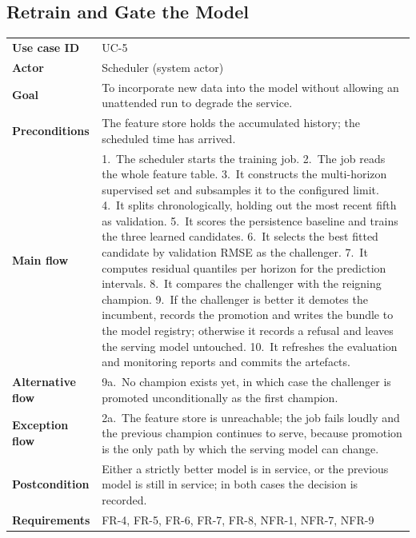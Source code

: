 \subsection{Retrain and Gate the Model}
\begin{xltabular}{\textwidth}{Q{2.9cm} Y}
\toprule
\bfseries Use case ID & UC-5 \\
\bfseries Actor & Scheduler (system actor) \\
\bfseries Goal & To incorporate new data into the model without allowing an
unattended run to degrade the service. \\
\bfseries Preconditions & The feature store holds the accumulated history; the
scheduled time has arrived. \\
\bfseries Main flow & 1.~The scheduler starts the training job. 2.~The job reads
the whole feature table. 3.~It constructs the multi-horizon supervised set and
subsamples it to the configured limit. 4.~It splits chronologically, holding out
the most recent fifth as validation. 5.~It scores the persistence baseline and
trains the three learned candidates. 6.~It selects the best fitted candidate by
validation RMSE as the challenger. 7.~It computes residual quantiles per horizon
for the prediction intervals. 8.~It compares the challenger with the reigning
champion. 9.~If the challenger is better it demotes the incumbent, records the
promotion and writes the bundle to the model registry; otherwise it records a
refusal and leaves the serving model untouched. 10.~It refreshes the evaluation
and monitoring reports and commits the artefacts. \\
\bfseries Alternative flow & 9a.~No champion exists yet, in which case the
challenger is promoted unconditionally as the first champion. \\
\bfseries Exception flow & 2a.~The feature store is unreachable; the job fails
loudly and the previous champion continues to serve, because promotion is the
only path by which the serving model can change. \\
\bfseries Postcondition & Either a strictly better model is in service, or the
previous model is still in service; in both cases the decision is recorded. \\
\bfseries Requirements & FR-4, FR-5, FR-6, FR-7, FR-8, NFR-1, NFR-7, NFR-9 \\
\bottomrule
\end{xltabular}

